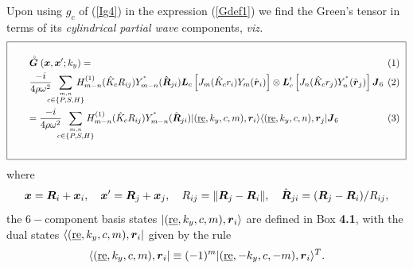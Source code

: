 Upon using $g_c$ of (\ref{Ig4}) in the expression (\ref{Gdef1}) we find
the Green's tensor in terms of its {\em cylindrical partial wave\/} components, {\em viz.\/}
\begin{displaymath}
\fbox{
\begin{minipage} {143.0mm}
\begin{eqnarray} \label{G1Trep}
\lefteqn{\rf{\bmi G}({\bmi x},{\bmi x}^{\prime};k_y)=}\nonumber\\
&&\!\!\!\!\!\!\!\!\!\!\!\!
\frac{-i}{4 \rho \omega^2}\!\!\!\!
\sum\limits_{\stackrel{m,n}{c\in\{P,S,H\}}}\!\! \!\!\!\! 
{H}_{m-n}^{(1)}(\hat{ K}_{c}{R}_{ij})
{Y}_{m-n}^{{}^\ast}(\hat{{\bmi R}}_{ji})
{\bmi L}_{c}\left[{ J}_{ m} (\hat{ K}_{c}{r}_{i}){Y}_{m}({\hat{\bmi r}}_{i})  \right] \otimes 
{\bmi  L}_{c}^{\prime}\left[{J}_{n}(\hat{ K}_{c}{r}_{j}){Y}_{n}^{{}^\ast}
({\hat{\bmi r}}_{j})  \right]{\bmi J}_{6}\nonumber\\
 &&\!\!\!\!\!\!\!\!\!\!\!\!=\frac{-i}{4 \rho \omega^2}\!\!\!\!
\sum\limits_{\stackrel{m,n}{c\in\{P,S,H\}}} \!\!\!\!\!\!
{H}_{m-n}^{(1)}(\hat{ K}_{c}{R}_{ij})
{Y}_{m-n}^{{}^\ast}(\hat{{\bmi R}}_{ji})
 |(\re,k_y,c,m),{\bmi r}_{i}\rangle 
 \langle(\re,k_y,c,n),{\bmi r}_{j}|{\bmi J}_{6}
\end{eqnarray} 
\vspace{2mm}
\end{minipage}
}
\end{displaymath}
where
\[
{\mbox{\boldmath$\mit x$\unboldmath}}={\mbox{\boldmath$\mit R$\unboldmath}}_i+{\mbox{\boldmath$\mit x$\unboldmath}}_i, \quad {\mbox{\boldmath$\mit x$\unboldmath}}^{\prime}={\mbox{\boldmath$\mit R$\unboldmath}}_j+{\mbox{\boldmath$\mit x$\unboldmath}}_j,
\quad  R_{ij}=\|{\mbox{\boldmath$\mit R$\unboldmath}}_j-{\mbox{\boldmath$\mit R$\unboldmath}}_i\|,
\quad \hat{{\mbox{\boldmath$\mit R$\unboldmath}}}_{ji}= ({\mbox{\boldmath$\mit R$\unboldmath}}_j-{\mbox{\boldmath$\mit R$\unboldmath}}_i)/R_{ij},
\]
the $6-$component basis states 
$|(\underline{\mbox{re}},k_y,c,m),{\mbox{\boldmath$\mit r$\unboldmath}}_{i}\rangle$ are defined in {\sc Box} {\bf 4.1}, 
with the dual states $\langle(\underline{\mbox{re}},k_y,c,m),{\mbox{\boldmath$\mit r$\unboldmath}}_{i}|$ given by the rule
\[
\langle(\underline{\mbox{re}},k_y,c,m),{\mbox{\boldmath$\mit r$\unboldmath}}_{i}|\equiv (-1)^m |(\underline{\mbox{re}},-k_y,c,-m),{\mbox{\boldmath$\mit r$\unboldmath}}_{i}\rangle^{T}.
\]
